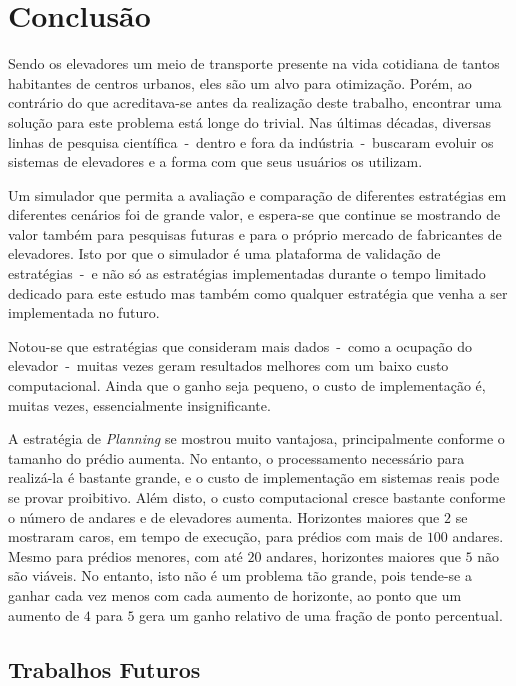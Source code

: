 \chapter{\label{chap:conclusion}Conclusão}

Sendo os elevadores um meio de transporte presente na vida cotidiana de tantos
habitantes de centros urbanos, eles são um alvo para otimização. Porém, ao
contrário do que acreditava-se antes da realização deste trabalho, encontrar uma
solução para este problema está longe do trivial. Nas últimas décadas, diversas
linhas de pesquisa científica~-~dentro e fora da indústria~-~buscaram evoluir os
sistemas de elevadores e a forma com que seus usuários os utilizam.

Um simulador que permita a avaliação e comparação de diferentes estratégias em
diferentes cenários foi de grande valor, e espera-se que continue se mostrando
de valor também para pesquisas futuras e para o próprio mercado de fabricantes
de elevadores. Isto por que o simulador é uma plataforma de validação de
estratégias~-~e não só as estratégias implementadas durante o tempo limitado
dedicado para este estudo mas também como qualquer estratégia que venha a ser
implementada no futuro.

Notou-se que estratégias que consideram mais dados~-~como a ocupação do
elevador~-~muitas vezes geram resultados melhores com um baixo custo
computacional. Ainda que o ganho seja pequeno, o custo de implementação é,
muitas vezes, essencialmente insignificante.

A estratégia de \textit{Planning} se mostrou muito vantajosa, principalmente
conforme o tamanho do prédio aumenta. No entanto, o processamento necessário
para realizá-la é bastante grande, e o custo de implementação em sistemas reais
pode se provar proibitivo. Além disto, o custo computacional cresce bastante
conforme o número de andares e de elevadores aumenta. Horizontes maiores que $2$
se mostraram caros, em tempo de execução, para prédios com mais de $100$
andares. Mesmo para prédios menores, com até $20$ andares, horizontes maiores
que $5$ não são viáveis. No entanto, isto não é um problema tão grande, pois
tende-se a ganhar cada vez menos com cada aumento de horizonte, ao ponto que um
aumento de $4$ para $5$ gera um ganho relativo de uma fração de ponto
percentual.

\section{Trabalhos Futuros}

